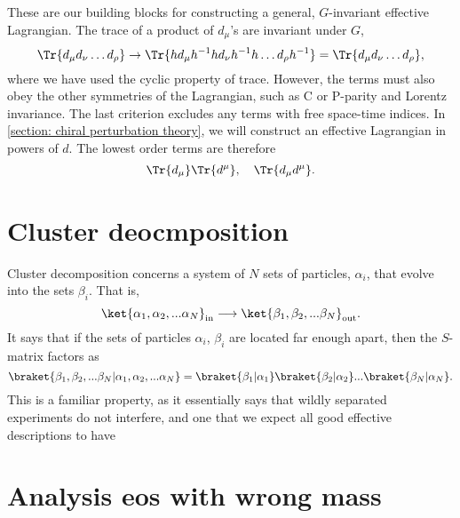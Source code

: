 \documentclass{book}
\begin{document}
These are our building blocks for constructing a general, $G$-invariant effective Lagrangian.
The trace of a product of $d_\mu$'s are invariant under $G$,
%
\begin{equation}
    \Tr{d_\mu d_\nu \dots d_\rho} 
    \rightarrow
    \Tr{h d_\mu h^{-1} h d_\nu h^{-1} h \dots d_\rho h^{-1}}
    = \Tr{d_\mu d_\nu \dots d_\rho},
\end{equation}
%
where we have used the cyclic property of trace.
However, the terms must also obey the other symmetries of the Lagrangian, such as C or P-parity and Lorentz invariance.
The last criterion excludes any terms with free space-time indices.
In \autoref{section: chiral perturbation theory}, we will construct an effective Lagrangian in powers of $d$.
The lowest order terms are therefore
%
\begin{equation}
    \label{first order terms CCWZ}
    \Tr{d_\mu} \Tr{d^\mu}, 
    \quad 
    \Tr{d_\mu d^\mu}.
\end{equation}
%


\section{Cluster deocmposition}

Cluster decomposition concerns a system of $N$ sets of particles, $\alpha_i$, that evolve into the sets $\beta_i$.
That is,
\begin{equation}
    \ket{\alpha_1, \alpha_2, ... \alpha_N}_\text{in}
    \longrightarrow
    \ket{\beta_1, \beta_2, ... \beta_N}_\text{out}.
\end{equation}
It says that if the sets of particles $\alpha_i$, $\beta_i$ are located far enough apart, then the $S$-matrix factors as
\begin{equation}
    {\braket{\beta_1, \beta_2, ... \beta_N|\alpha_1, \alpha_2, ... \alpha_N}}
    =
    \braket{\beta_1|\alpha_1}\braket{\beta_2|\alpha_2}... \braket{\beta_N|\alpha_N}.
\end{equation}
This is a familiar property, as it essentially says that wildly separated experiments do not interfere, and one that we expect all good effective descriptions to have


\section{Analysis eos with wrong mass}
\end{document}
